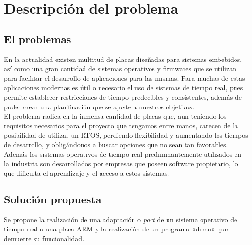 \chapter{Descripción del problema}
\section{El problemas}
En la actualidad existen multitud de placas diseñadas para sistemas embebidos, así como una gran cantidad de sistemas operativos y firmwares que se utilizan para facilitar el desarrollo de aplicaciones para las mismas.
Para muchas de estas aplicaciones modernas es útil o necesario el uso de sistemas de tiempo real, pues permite establecer restricciones de tiempo predecibles y consistentes, además de poder crear una planificación que se ajuste a nuestros objetivos.\\

El problema radica en la inmensa cantidad de placas que, aun teniendo los requisitos necesarios para el proyecto que tengamos entre manos, carecen de la posibilidad de utilizar un RTOS, perdiendo flexibilidad y aumentando los tiempos de desarrollo, y obligándonos a buscar opciones que no sean tan favorables.
Además los sistemas operativos de tiempo real prediminantemente utilizados en la industria son desarrollados por empresas que poseen software propietario, lo que dificulta el aprendizaje y el acceso a estos sistemas.


\section{Solución propuesta}
Se propone la realización de una adaptación o \textit{port} de un sistema operativo de tiempo real a una placa ARM y la realización de un programa «demo» que demuetre su funcionalidad.


